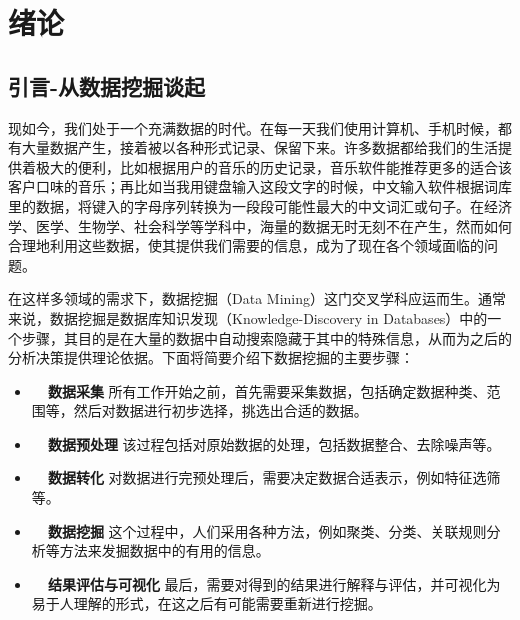 
\chapter{绪论}
\label{chapter:introduction}
\section{引言-从数据挖掘谈起}
现如今，我们处于一个充满数据的时代。在每一天我们使用计算机、手机时候，都有大量数据产生，接着被以各种形式记录、保留下来。许多数据都给我们的生活提供着极大的便利，比如根据用户的音乐的历史记录，音乐软件能推荐更多的适合该客户口味的音乐；再比如当我用键盘输入这段文字的时候，中文输入软件根据词库里的数据，将键入的字母序列转换为一段段可能性最大的中文词汇或句子。在经济学、医学、生物学、社会科学等学科中，海量的数据无时无刻不在产生，然而如何合理地利用这些数据，使其提供我们需要的信息，成为了现在各个领域面临的问题。

在这样多领域的需求下，数据挖掘（Data Mining）这门交叉学科应运而生。通常来说，数据挖掘是数据库知识发现（Knowledge-Discovery in Databases）中的一个步骤，其目的是在大量的数据中自动搜索隐藏于其中的特殊信息，从而为之后的分析决策提供理论依据。下面将简要介绍下数据挖掘的主要步骤：
\vspace{4mm}
\begin{itemize}
    \item \textbf{~~数据采集} 所有工作开始之前，首先需要采集数据，包括确定数据种类、范围等，然后对数据进行初步选择，挑选出合适的数据。
    \item \textbf{~~数据预处理} 该过程包括对原始数据的处理，包括数据整合、去除噪声等。
    \item \textbf{~~数据转化} 对数据进行完预处理后，需要决定数据合适表示，例如特征选筛等。
    \item \textbf{~~数据挖掘} 这个过程中，人们采用各种方法，例如聚类、分类、关联规则分析等方法来发掘数据中的有用的信息。
    \item \textbf{~~结果评估与可视化} 最后，需要对得到的结果进行解释与评估，并可视化为易于人理解的形式，在这之后有可能需要重新进行挖掘。
\end{itemize}

